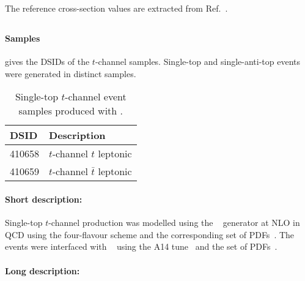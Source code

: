The reference cross-section values are extracted from Ref.~\cite{LHCTopWGsgtopXsec}.


\subsection[Powheg+Pythia8]{\POWPY[8]}
\label{subsubsec:tchan_PP8}

\paragraph{Samples}

 gives the DSIDs of the $t$-channel \POWPY[8] samples.
Single-top and single-anti-top events were generated in distinct samples.

\begin{table}[!htbp]
  \caption{Single-top $t$-channel event samples produced with \POWPY[8].}%
  \label{tab:tchan_PP8}
  \centering
  \begin{tabular}{l l}
    \toprule
    DSID & Description \\
    \midrule
    410658 & $t$-channel $t$ leptonic \\
    410659 & $t$-channel $\bar{t}$ leptonic \\
    \bottomrule
  \end{tabular}
\end{table}

\paragraph{Short description:}

Single-top $t$-channel production was modelled using the
\POWHEGBOX[v2]~\cite{Frederix:2012dh,Nason:2004rx,Frixione:2007vw,Alioli:2010xd}
generator at NLO in QCD using the four-flavour scheme and the
corresponding \NNPDF[3.0nlo] set of PDFs~\cite{Ball:2014uwa}.  The events were
interfaced with \PYTHIA[8.230]~\cite{Sjostrand:2014zea} using the A14
tune~\cite{ATL-PHYS-PUB-2014-021} and the \NNPDF[2.3lo] set of
PDFs~\cite{Ball:2012cx}.




\paragraph{Long description:}

